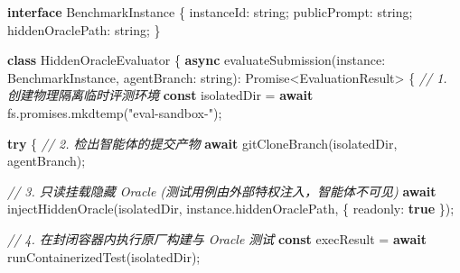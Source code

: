 \documentclass[
]{ctexart}
\newenvironment{Shaded}{}{}
\newcommand{\AttributeTok}[1]{\textcolor[rgb]{0.49,0.56,0.16}{#1}}
\newcommand{\BuiltInTok}[1]{\textcolor[rgb]{0.00,0.50,0.00}{#1}}
\newcommand{\CommentTok}[1]{\textcolor[rgb]{0.38,0.63,0.69}{\textit{#1}}}
\newcommand{\ControlFlowTok}[1]{\textcolor[rgb]{0.00,0.44,0.13}{\textbf{#1}}}
\newcommand{\DataTypeTok}[1]{\textcolor[rgb]{0.56,0.13,0.00}{#1}}
\newcommand{\FunctionTok}[1]{\textcolor[rgb]{0.02,0.16,0.49}{#1}}
\newcommand{\KeywordTok}[1]{\textcolor[rgb]{0.00,0.44,0.13}{\textbf{#1}}}
\newcommand{\NormalTok}[1]{#1}
\newcommand{\OperatorTok}[1]{\textcolor[rgb]{0.40,0.40,0.40}{#1}}
\newcommand{\StringTok}[1]{\textcolor[rgb]{0.25,0.44,0.63}{#1}}
\renewcommand{\_}{\discretionary{}{}{\textunderscore}}
\begin{document}
\begin{Shaded}
\begin{Highlighting}[]
\KeywordTok{interface}\NormalTok{ BenchmarkInstance \{}
\NormalTok{  instanceId}\OperatorTok{:} \DataTypeTok{string}\OperatorTok{;}
\NormalTok{  publicPrompt}\OperatorTok{:} \DataTypeTok{string}\OperatorTok{;}
\NormalTok{  hiddenOraclePath}\OperatorTok{:} \DataTypeTok{string}\OperatorTok{;}
\NormalTok{\}}

\KeywordTok{class}\NormalTok{ HiddenOracleEvaluator \{}
  \KeywordTok{async} \FunctionTok{evaluateSubmission}\NormalTok{(instance}\OperatorTok{:}\NormalTok{ BenchmarkInstance}\OperatorTok{,}\NormalTok{ agentBranch}\OperatorTok{:} \DataTypeTok{string}\NormalTok{)}\OperatorTok{:} \BuiltInTok{Promise}\OperatorTok{\textless{}}\NormalTok{EvaluationResult}\OperatorTok{\textgreater{}}\NormalTok{ \{}
    \CommentTok{// 1. 创建物理隔离临时评测环境}
    \KeywordTok{const}\NormalTok{ isolatedDir }\OperatorTok{=} \ControlFlowTok{await}\NormalTok{ fs}\OperatorTok{.}\AttributeTok{promises}\OperatorTok{.}\FunctionTok{mkdtemp}\NormalTok{(}\StringTok{"eval{-}sandbox{-}"}\NormalTok{)}\OperatorTok{;}

    \ControlFlowTok{try}\NormalTok{ \{}
      \CommentTok{// 2. 检出智能体的提交产物}
      \ControlFlowTok{await} \FunctionTok{gitCloneBranch}\NormalTok{(isolatedDir}\OperatorTok{,}\NormalTok{ agentBranch)}\OperatorTok{;}

      \CommentTok{// 3. 只读挂载隐藏 Oracle (测试用例由外部特权注入，智能体不可见)}
      \ControlFlowTok{await} \FunctionTok{injectHiddenOracle}\NormalTok{(isolatedDir}\OperatorTok{,}\NormalTok{ instance}\OperatorTok{.}\AttributeTok{hiddenOraclePath}\OperatorTok{,}\NormalTok{ \{ readonly}\OperatorTok{:} \KeywordTok{true}\NormalTok{ \})}\OperatorTok{;}

      \CommentTok{// 4. 在封闭容器内执行原厂构建与 Oracle 测试}
      \KeywordTok{const}\NormalTok{ execResult }\OperatorTok{=} \ControlFlowTok{await} \FunctionTok{runContainerizedTest}\NormalTok{(isolatedDir)}\OperatorTok{;}


\end{Highlighting}
\end{Shaded}
\end{document}
